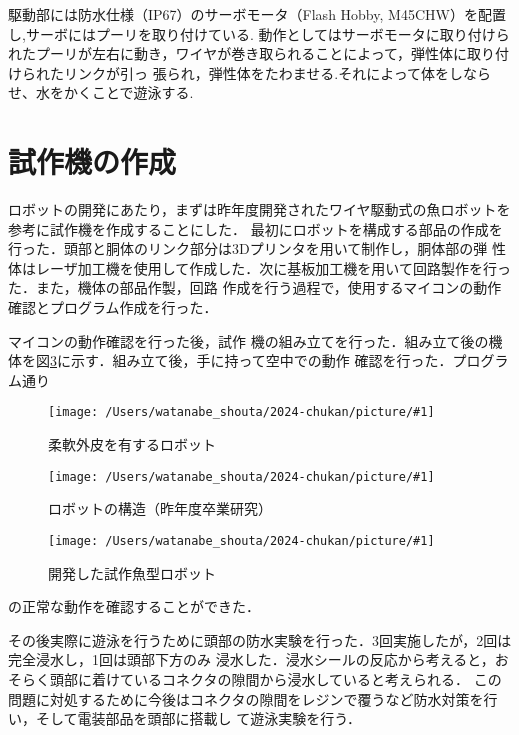 \documentclass{jarticle}
\newcommand{\setPicture}[1]{\texttt{[image: /Users/watanabe\_shouta/2024-chukan/picture/\#1]}}
\begin{document}
駆動部には防水仕様（IP67）のサーボモータ（Flash Hobby, M45CHW）を配置し,サーボにはプーリを取り付けている.
動作としてはサーボモータに取り付けられたプーリが左右に動き，ワイヤが巻き取られることによって，弾性体に取り付けられたリンクが引っ
張られ，弾性体をたわませる.それによって体をしならせ、水をかくことで遊泳する.



\section{試作機の作成}
ロボットの開発にあたり，まずは昨年度開発されたワイヤ駆動式の魚ロボットを参考に試作機を作成することにした．
最初にロボットを構成する部品の作成を行った．頭部と胴体のリンク部分は3Dプリンタを用いて制作し，胴体部の弾
性体はレーザ加工機を使用して作成した．次に基板加工機を用いて回路製作を行った．また，機体の部品作製，回路
作成を行う過程で，使用するマイコンの動作確認とプログラム作成を行った．

マイコンの動作確認を行った後，試作
機の組み立てを行った．組み立て後の機体を図\ref{fig:fish-type}に示す．組み立て後，手に持って空中での動作
確認を行った．プログラム通り
\newpage

\begin{figure}[H]
   \centering
   \setPicture{fish-torso.jpg}
   \vspace*{-4mm}
   \caption{柔軟外皮を有するロボット\cite{ni}}
   \label{fig:bandable-Torso}
\end{figure}
\vspace{-4mm}
\begin{figure}[H]
   \centering
   \setPicture{tentativeschematic.png}
   \vspace*{-4mm}
   \caption{ロボットの構造（昨年度卒業研究）}
   \label{fig:structure}
\end{figure}
\vspace{-4mm}
\begin{figure}[H]
   \centering
   \setPicture{fish-copy.jpg}
   \vspace*{-4mm}
   \caption{開発した試作魚型ロボット}
   \label{fig:fish-type}
\end{figure}
\vspace{-4mm}

\noindent の正常な動作を確認することができた．%


その後実際に遊泳を行うために頭部の防水実験を行った．3回実施したが，2回は完全浸水し，1回は頭部下方のみ
浸水した．浸水シールの反応から考えると，おそらく頭部に着けているコネクタの隙間から浸水していると考えられる．
この問題に対処するために今後はコネクタの隙間をレジンで覆うなど防水対策を行い，そして電装部品を頭部に搭載し
て遊泳実験を行う．
\end{document}
